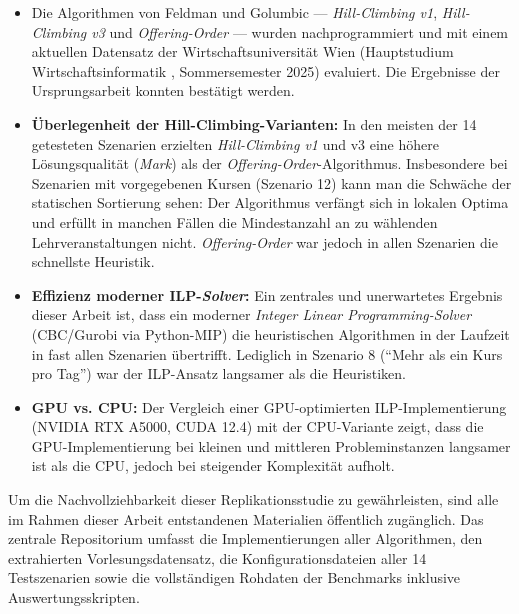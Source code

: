 \begin{itemize}
  \item Die Algorithmen von Feldman und Golumbic \cite{feldmangolumbic} --- \textit{Hill-Climbing v1}, \textit{Hill-Climbing v3} und \textit{Offering-Order} --- wurden nachprogrammiert und mit einem aktuellen Datensatz der Wirtschaftsuniversität Wien (Hauptstudium Wirtschaftsinformatik \cite[S. 13f]{wu-stupl}, Sommersemester 2025) evaluiert. Die Ergebnisse der Ursprungsarbeit konnten bestätigt werden.
  \item \textbf{Überlegenheit der Hill-Climbing-Varianten:} In den meisten der 14 getesteten Szenarien erzielten \textit{Hill-Climbing v1} und v3 eine höhere Lösungsqualität (\textit{Mark}) als der \textit{Offering-Order}-Algorithmus. Insbesondere bei Szenarien mit vorgegebenen Kursen (Szenario 12) kann man die Schwäche der statischen Sortierung sehen: Der Algorithmus verfängt sich in lokalen Optima und erfüllt in manchen Fällen die Mindestanzahl an zu wählenden Lehrveranstaltungen nicht. \textit{Offering-Order} war jedoch in allen Szenarien die schnellste Heuristik.
  \item \textbf{Effizienz moderner ILP-\textit{Solver}:} Ein zentrales und unerwartetes Ergebnis dieser Arbeit ist, dass ein moderner \textit{Integer Linear Programming-Solver} (CBC/Gurobi via Python-MIP) die heuristischen Algorithmen in der Laufzeit in fast allen Szenarien übertrifft. Lediglich in Szenario 8 (\enquote{Mehr als ein Kurs pro Tag}) war der ILP-Ansatz langsamer als die Heuristiken.
  \item \textbf{GPU vs. CPU:} Der Vergleich einer GPU-optimierten ILP-Implementierung (NVIDIA RTX A5000, CUDA 12.4) mit der CPU-Variante zeigt, dass die GPU-Implementierung bei kleinen und mittleren Probleminstanzen langsamer ist als die CPU, jedoch bei steigender Komplexität aufholt.
\end{itemize}




Um die Nachvollziehbarkeit dieser Replikationsstudie zu gewährleisten, sind alle im Rahmen dieser Arbeit entstandenen Materialien öffentlich zugänglich. Das zentrale Repositorium \cite{gh-repo} umfasst die Implementierungen aller Algorithmen, den extrahierten Vorlesungsdatensatz, die Konfigurationsdateien aller 14 Testszenarien sowie die vollständigen Rohdaten der Benchmarks inklusive Auswertungsskripten.




